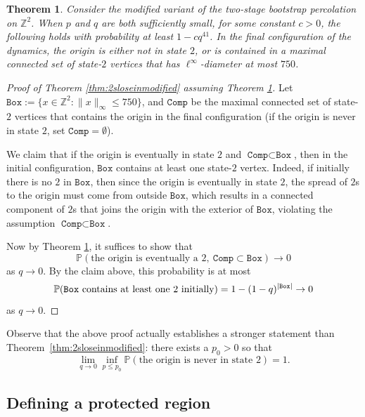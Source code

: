 \documentclass{article}
\renewcommand{\P}{\mathbb{P}}
\def\Z{\mathbb{Z}}
\newcommand{\bZ}{{\mathbb Z}}
\numberwithin{equation}{section}
\newtheorem{theorem}{Theorem}[section]
\begin{document}
\begin{theorem}\label{thm:2sloseinmodified-stronger}
    Consider the modified variant of the two-stage bootstrap percolation on $\Z^2$.
    When $p$ and $q$ are both sufficiently small, for some constant $c > 0$, the following holds with probability at least $1 - cq^{41}$.
    In the final configuration of the dynamics, the origin is either not in state $2$, or is contained in a maximal connected set of state-$2$ vertices that has $\ell^\infty$-diameter at most $750$.
\end{theorem}
\begin{proof}[Proof of Theorem \ref{thm:2sloseinmodified} assuming Theorem \ref{thm:2sloseinmodified-stronger}]
    Let $\texttt{Box} := \{x \in \bZ^2 : \|x\|_\infty \leq 750\}$, and $\texttt{Comp}$ be the maximal connected set of state-$2$ vertices that contains the origin in the final configuration (if the origin is never in state $2$, set $\texttt{Comp} = \emptyset$).
    
    We claim that if the origin is eventually in state $2$ and $\texttt{Comp} \subset \texttt{Box}$, 
    then in the initial configuration, $\texttt{Box}$ contains at least one state-$2$ vertex.
    Indeed, if initially there is no $2$ in $\texttt{Box}$, then since the origin is eventually in state $2$, the spread of $2$s to the origin must come from outside $\texttt{Box}$, which results in a connected component of $2$s that joins the origin with the exterior of $\texttt{Box}$, violating the assumption $\texttt{Comp} \subset \texttt{Box}$.

    Now by Theorem \ref{thm:2sloseinmodified-stronger}, it suffices to show that
    \[
    \P(\text{the origin is eventually a 2}, \  \texttt{Comp} \subset \texttt{Box}) \to 0 
    \]
    as $q \to 0$.
    By the claim above, this probability is at most
    \[
    \P(\texttt{Box} \  \text{contains at least one $2$ initially}) \\
    =
    1 - (1 - q)^{|\texttt{Box}|}
     \to 0
    \]
    as $q \to 0$.
\end{proof}

Observe that the above proof actually establishes a stronger statement than Theorem~\ref{thm:2sloseinmodified}: there exists a $p_0>0$ so that 
$$
\lim_{q\to 0}\inf_{p\le p_0}
\P(\text{the origin is never in state $2$})=1.
$$

\subsection{Defining a protected region}
\end{document}
